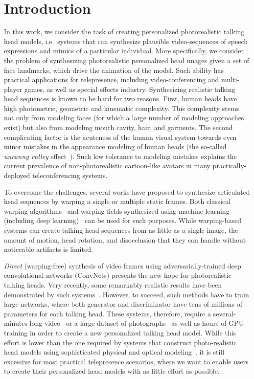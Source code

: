 \documentclass[10pt,twocolumn,letterpaper]{article}
\begin{document}
\section{Introduction}

In this work, we consider the task of creating personalized photorealistic talking head models, i.e.\ systems that can synthesize plausible video-sequences of speech expressions and mimics of a particular individual. More specifically, we consider the problem of synthesizing photorealistic personalized head images given a set of face landmarks, which drive the animation of the model. Such ability has practical applications for telepresence, including video-conferencing and multi-player games, as well as special effects industry. Synthesizing realistic talking head sequences is known to be hard for two reasons. First, human heads have high photometric, geometric and kinematic complexity. This complexity stems not only from modeling faces (for which a large number of modeling approaches exist) but also from modeling mouth cavity, hair, and garments. The second complicating factor is the acuteness of the human visual system towards even minor mistakes in the appearance modeling of human heads (the so-called \textit{uncanny valley} effect~\cite{Mori70}). Such low tolerance to modeling mistakes explains the current prevalence of non-photorealistic cartoon-like avatars in many practically-deployed teleconferencing systems.

To overcome the challenges, several works have proposed to synthesize articulated head sequences by warping a single or multiple static frames. Both classical warping algorithms~\cite{Averbuch17,Seitz96} and warping fields synthesized using machine learning (including deep learning)~\cite{Ganin16,Shu18,Wiles18} can be used for such purposes. While warping-based systems can create talking head sequences from as little as a single image, the amount of motion, head rotation, and disocclusion that they can handle without noticeable artifacts is limited.

\textit{Direct} (warping-free) synthesis of video frames using adversarially-trained deep convolutional networks (ConvNets) presents the new hope for photorealistic talking heads. Very recently, some remarkably realistic results have been demonstrated by such systems~\cite{Isola17,Kim18,Wang18c}. However, to succeed, such methods have to train large networks, where both generator and discriminator have tens of millions of parameters for each talking head. These systems, therefore, require a several-minutes-long video~\cite{Kim18,Wang18c} or a large dataset of photographs~\cite{Isola17} as well as hours of GPU training in order to create a new personalized talking head model. While this effort is lower than the one required by systems that construct photo-realistic head models using sophisticated physical and optical modeling~\cite{alexander2010digital}, it is still excessive for most practical telepresence scenarios, where we want to enable users to create their personalized head models with as little effort as possible. 
\end{document}
